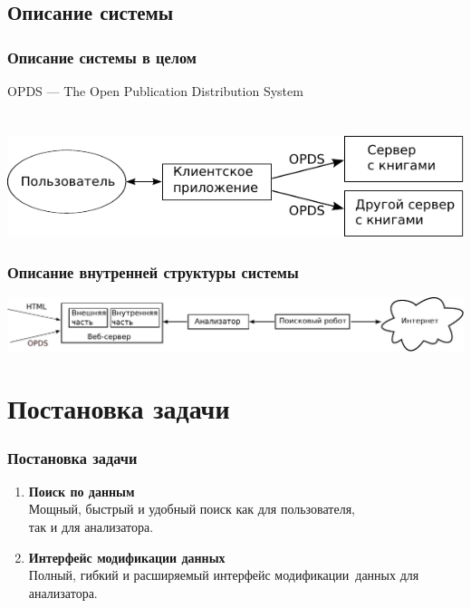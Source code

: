 \documentclass[utf8,handout]{beamer}
\begin{document}
\subsection{Описание системы}
	\begin{frame}
		\frametitle{Описание системы в целом}
		OPDS --- The Open Publication Distribution System \\ 
~\\
~\\
		\includegraphics{./head/scheme}
	\end{frame}

	\begin{frame}
		\frametitle{Описание внутренней структуры системы}
		\includegraphics[width=1.05\textwidth]{./head/innerstructure}
	\end{frame}


\section{Постановка задачи}
	\begin{frame}
		\frametitle{Постановка задачи}
		\begin{enumerate}
			\item \textbf{Поиск по данным} \\
				Мощный, быстрый и удобный поиск как для пользователя, \\
				так и для анализатора.
			\item \textbf{Интерфейс модификации данных} \\
				Полный, гибкий и расширяемый интерфейс модификации~данных для анализатора.		
		\end{enumerate}
	\end{frame}
\end{document}
